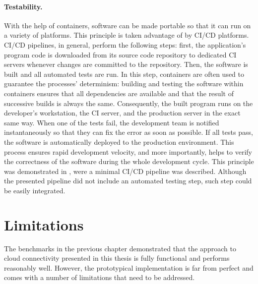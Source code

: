 \paragraph{Testability.}
With the help of containers, software can be made portable so that it can run on a variety of platforms. This principle is taken advantage of by CI/CD platforms. CI/CD pipelines, in general, perform the following steps: first, the application's program code is downloaded from its source code repository to dedicated CI servers whenever changes are committed to the repository. Then, the software is built and all automated tests are run. In this step, containers are often used  \cite{barna2017delivering} to guarantee the processes' determinism: building and testing the software within containers ensures that all dependencies are available and that the result of successive builds is always the same. Consequently, the built program runs on the developer's workstation, the CI server, and the production server in the exact same way.
When one of the tests fail, the development team is notified instantaneously so that they can fix the error as soon as possible. If all tests pass, the software is automatically deployed to the production environment. This process ensures rapid development velocity, and more importantly, helps to verify the correctness of the software during the whole development cycle. This principle was demonstrated in , were a minimal CI/CD pipeline was described. Although the presented pipeline did not include an automated testing step, such step could be easily integrated.

%
%
%
%
%
%
%
%
%
%
\section{Limitations}
The benchmarks in the previous chapter demonstrated that the approach to cloud connectivity presented in this thesis is fully functional and performs reasonably well. However, the prototypical implementation is far from perfect and comes with a number of limitations that need to be addressed.

